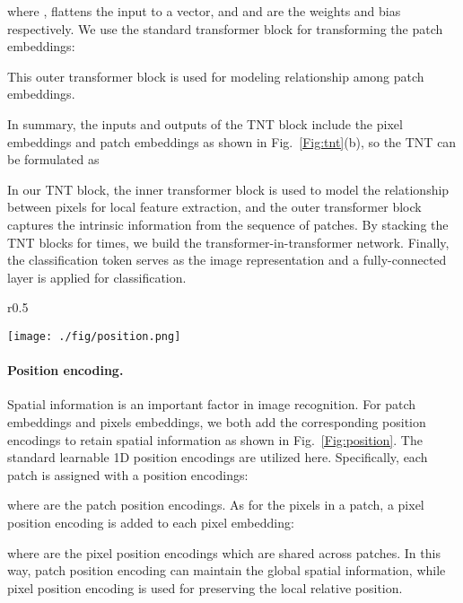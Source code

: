 \documentclass{article}
\begin{document}
where ,  flattens the input to a vector, and  and  are the weights and bias respectively.  We use the standard transformer block for transforming the patch embeddings:

This outer transformer block  is used for modeling relationship among patch embeddings.

In summary, the inputs and outputs of the TNT block include the pixel embeddings and patch embeddings as shown in Fig.~\ref{Fig:tnt}(b), so the TNT can be formulated as

In our TNT block, the inner transformer block is used to model the relationship between pixels for local feature extraction, and the outer transformer block captures the intrinsic information from the sequence of patches. By stacking the TNT blocks for  times, we build the transformer-in-transformer network. Finally, the classification token serves as the image representation and a fully-connected layer is applied for classification.

\begin{wrapfigure}{r}{0.5\textwidth}
	\vspace{-1.5em}
	\begin{center}
		\texttt{[image: ./fig/position.png]}
	\end{center}
	\vspace{-1em}
	\caption{Patch-level and pixel-level position encodings.}\label{Fig:position}
	\vspace{-0em}
\end{wrapfigure}


\paragraph{Position encoding.}
Spatial information is an important factor in image recognition. For patch embeddings and pixels embeddings, we both add the corresponding position encodings to retain spatial information as shown in Fig.~\ref{Fig:position}. The standard learnable 1D position encodings are utilized here. Specifically, each patch is assigned with a position encodings:

where  are the patch position encodings. As for the pixels in a patch, a pixel position encoding is added to each pixel embedding:

where  are the pixel position encodings which are shared across patches. In this way, patch position encoding can maintain the global spatial information, while pixel position encoding is used for preserving the local relative position.
\end{document}
